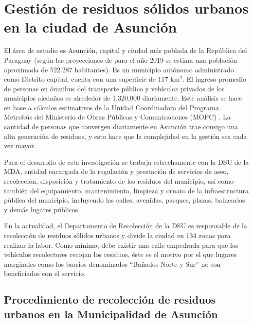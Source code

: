\section{Gestión de residuos sólidos urbanos en la ciudad de Asunción}

El área de estudio es Asunción, capital y ciudad más poblada de la República del Paraguay (según las proyecciones de \citet{2015Proyeccion2000-2025} para el año 2019 se estima una población aproximada de 522.287 habitantes). Es un municipio autónomo administrado como Distrito capital, cuenta con una superficie de 117 km$^{2}$. El ingreso promedio de personas en ómnibus del transporte público y vehículos privados de los municipios aledaños es alrededor de 1.320.000 diariamente. Este análisis se hace en base a cálculos estimativos de la Unidad Coordinadora del Programa Metrobús del Ministerio de Obras Públicas y Comunicaciones (MOPC) \citep{DiarioABCColor2016PorColor}. La cantidad de personas que convergen diariamente en Asunción trae consigo una alta generación de residuos, y esto hace que la complejidad en la gestión sea cada vez mayor.

Para el desarrollo de esta investigación se trabaja estrechamente con la DSU de la MDA, entidad encargada de la regulación y prestación de servicios de aseo, recolección, disposición y tratamiento de los residuos del municipio, así como también del equipamiento, mantenimiento, limpieza y ornato de la infraestructura pública del municipio, incluyendo las calles, avenidas, parques, plazas, balnearios y demás lugares públicos.


En la actualidad, el Departamento de Recolección de la DSU es responsable de la recolección de residuos sólidos urbanos y divide la ciudad en 134 zonas para realizar la labor. Como mínimo, debe existir una calle empedrada para que los vehículos recolectores recojan los residuos, éste es el motivo por el que lugares marginales como los barrios denominados ``Bañados Norte y Sur'' no son beneficiados con el servicio.


\subsection{Procedimiento de recolección de residuos urbanos en la Municipalidad de Asunción}

